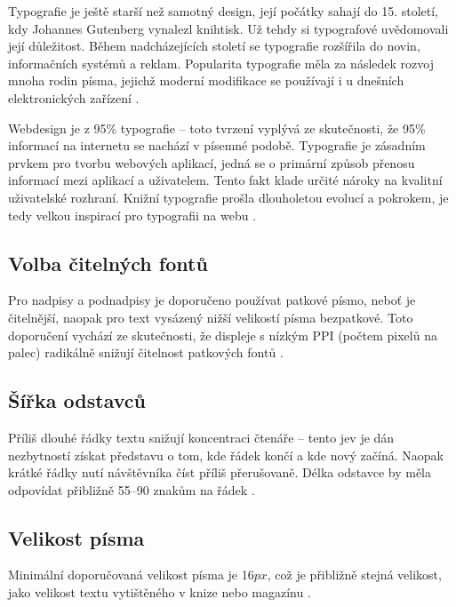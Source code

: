 \begin{quote}
     \cite{9}
\end{quote}

\noindent
Typografie je ještě starší než samotný design, její počátky sahají do 15. století, kdy Johannes Gutenberg vynalezl knihtisk. Už tehdy si typografové uvědomovali její důležitost. Během nadcházejících století se typografie rozšířila do novin, informačních systémů a reklam. Popularita typografie měla za následek rozvoj mnoha rodin písma, jejichž moderní modifikace se používají i u dnešních elektronických zařízení \cite{1}.

Webdesign je z 95\% typografie -- toto tvrzení vyplývá ze skutečnosti, že 95\% informací na internetu se nachází v písemné podobě. Typografie je zásadním prvkem pro tvorbu webových aplikací, jedná se o primární způsob přenosu informací mezi aplikací a uživatelem. Tento fakt klade určité nároky na kvalitní uživatelské rozhraní. Knižní typografie prošla dlouholetou evolucí a pokrokem, je tedy velkou inspirací pro typografii na webu \cite{7} \cite{12}.

\subsection{Volba čitelných fontů}

Pro nadpisy a podnadpisy je doporučeno používat patkové písmo, neboť je čitelnější, naopak pro text vysázený nižší velikostí písma bezpatkové. Toto doporučení vychází ze skutečnosti, že displeje s nízkým PPI (počtem pixelů na palec) radikálně snižují čitelnost patkových fontů \cite{10}.

\subsection{Šířka odstavců}

Příliš dlouhé řádky textu snižují koncentraci čtenáře -- tento jev je dán nezbytností získat představu o tom, kde řádek končí a kde nový začíná. Naopak krátké řádky nutí návštěvníka číst příliš přerušovaně. Délka odstavce by měla odpovídat přibližně 55--90 znakům na řádek \cite{10}.

\subsection{Velikost písma}

Minimální doporučovaná velikost písma je 16$px$, což je přibližně stejná velikost, jako velikost textu vytištěného v knize nebo magazínu \cite{13} \cite{10}.

